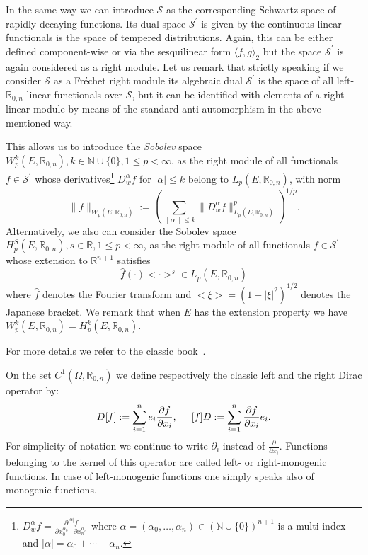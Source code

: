 \documentclass[12pt]{amsart}
\theoremstyle{definition}
\newcommand{\R}{\mathbb{R}}
\newcommand{\N}{\mathbb{N}}
\newcommand{\Cl}{\R_{0,n}}
\newcommand{\Om}{\Omega}
\begin{document}
In the same way we can introduce $\mathcal{S}$ as the corresponding Schwartz space of rapidly decaying functions. Its dual space $\mathcal{S}^\prime$ is given by the continuous linear functionals is the space of tempered distributions.  Again, this can be either defined component-wise or via the sesquilinear form 
$\langle f,g \rangle_{2}$ but the space $\mathcal{S}^\prime$ is again considered as a right module. Let us remark that strictly speaking if we consider $\mathcal{S}$ as a Fr\'echet right module its algebraic dual $\mathcal{S}^\prime$ is the space of all left-$\Cl$-linear functionals over $\mathcal{S}$, but it can be identified with elements of a right-linear module by means of the standard anti-automorphism in the above mentioned way.
 
This allows us to introduce the {\it Sobolev} space $W_p^k(E,\Cl), k\in \mathbb{N}\cup\{0\},1\leq p<\infty$, as the right module of all functionals $f\in \mathcal{S}^\prime$ whose derivatives\footnote{$D^\alpha_w f=\frac{\partial^{|\alpha |}f}{\partial x_0^{\alpha_0}\cdots\partial x_n^{\alpha_n}}$ where $\alpha=(\alpha_0,\ldots,\alpha_n)\in\left(\N\cup\{0\}\right)^{n+1}$ is a multi-index and $|\alpha |=\alpha_0+\cdots+\alpha_n$.}	 $D^\alpha_w f$ for $|\alpha | \leq k$ belong to $L_p(E,\Cl)$, with norm
  $$
  \|f\|_{W_p(E,\Cl)}:=\left(\sum_{\|\alpha\| \leq k}\| D^\alpha_w f \|_{L_p(E,\Cl)}^p\right)^{1/p}.
  $$ 
 Alternatively, we also can consider the Sobolev space  $H_p^S(E,\Cl), s\in \mathbb{R},1\leq p<\infty$, as the right module of all functionals $f\in \mathcal{S}^\prime$ whose extension to $\mathbb{R}^{n+1}$ satisfies
 $$
\hat{f} ( \cdot ) < \cdot >^s \in L_p(E,\Cl)
 $$ 
where $\hat f$ denotes the Fourier transform and $<\xi>=(1+|\xi |^2)^{1/2}$ denotes the Japanese bracket. We remark that when $E$ has the extension property we have $W_p^k(E,\Cl)=H_p^k(E,\Cl)$.
% 
 
For more details we refer to the classic book~\cite{BDS}.


On the set $C^1(\Om,\Cl)$ we define respectively the classic left and the right Dirac operator by: 
\begin{equation}\label{Op Dif}
D[f]:=\sum_{i=1}^n e_i\frac{\partial f}{\partial x_i}, \hspace{.5cm} [f]D:=\sum_{i=1}^n\frac{\partial f}{\partial x_i}e_i.
\end{equation}
For simplicity of notation we continue to write $\partial_{i}$ instead of $\displaystyle\frac{\partial}{\partial x_i}$. Functions belonging to the kernel of this operator are called left- or right-monogenic functions. In case of left-monogenic functions one simply speaks also of monogenic functions. 
\end{document}
